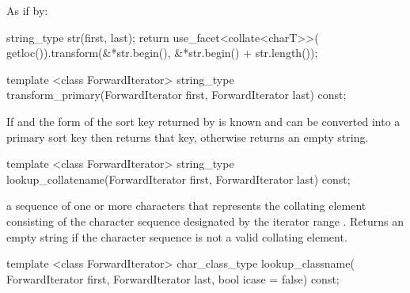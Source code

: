 \begin{itemdescr}
\pnum\effects
As if by:
\begin{codeblock}
string_type str(first, last);
return use_facet<collate<charT>>(
  getloc()).transform(&*str.begin(), &*str.begin() + str.length());
\end{codeblock}
\end{itemdescr}

%
\begin{itemdecl}
template <class ForwardIterator>
  string_type transform_primary(ForwardIterator first, ForwardIterator last) const;
\end{itemdecl}

\begin{itemdescr}
\pnum\effects If 
and the form of the sort key returned
by  is known and
can be converted into a primary sort key then returns that key,
otherwise returns an empty string.
\end{itemdescr}

%
\begin{itemdecl}
template <class ForwardIterator>
  string_type lookup_collatename(ForwardIterator first, ForwardIterator last) const;
\end{itemdecl}

\begin{itemdescr}
\pnum\returns a sequence of one or more characters that
represents the collating element consisting of the character
sequence designated by the iterator range .
Returns an empty string if the character sequence is not a
valid collating element.
\end{itemdescr}

%
\begin{itemdecl}
template <class ForwardIterator>
  char_class_type lookup_classname(
    ForwardIterator first, ForwardIterator last, bool icase = false) const;
\end{itemdecl}

